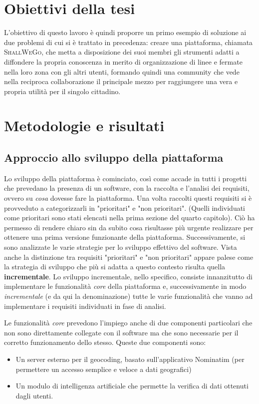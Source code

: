 \section{Obiettivi della tesi}
    L'obiettivo di questo lavoro è quindi proporre un primo esempio di soluzione ai due problemi di cui si è trattato in precedenza: creare una piattaforma, chiamata \textsc{ShallWeGo}, che metta a disposizione dei suoi membri gli strumenti adatti a diffondere la propria conoscenza in merito di organizzazione di linee e fermate nella loro zona con gli altri utenti, formando quindi una community che vede nella reciproca collaborazione il principale mezzo per raggiungere una vera e propria utilità per il singolo cittadino.

    
    
\section{Metodologie e risultati}
    \subsection{Approccio allo sviluppo della piattaforma}
        Lo sviluppo della piattaforma è cominciato, così come accade in tutti i progetti che prevedano la presenza di un software, con la raccolta e l'analisi dei requisiti, ovvero su \textit{cosa} dovesse fare la piattaforma. Una volta raccolti questi requisiti si è provveduto a categorizzarli in "prioritari" e "non prioritari". (Quelli individuati come prioritari sono stati elencati nella prima sezione del quarto capitolo). Ciò ha permesso di rendere chiaro sin da subito cosa risultasse più urgente realizzare per ottenere una prima versione funzionante della piattaforma. 
        Successivamente, si sono analizzate le varie strategie per lo sviluppo effettivo del software. Vista anche la distinzione tra requisiti "prioritari" e "non prioritari" appare palese come la strategia di sviluppo che più si adatta a questo contesto risulta quella \textbf{incrementale}. Lo sviluppo incrementale, nello specifico, consiste innanzitutto di implementare le funzionalità \textit{core} della piattaforma e, successivamente in modo \textit{incrementale} (e da qui la denominazione) tutte le varie funzionalità che vanno ad implementare i requisiti individuati in fase di analisi. 
        
        Le funzionalità \textit{core} prevedono l'impiego anche di due componenti particolari che non sono direttamente collegate con il software ma che sono necessarie per il corretto funzionamento dello stesso. Queste due componenti sono:
        \begin{itemize}
            \item Un server esterno per il geocoding, basato sull'applicativo Nominatim (per permettere un accesso semplice e veloce a dati geografici)
            \item Un modulo di intelligenza artificiale che permette la verifica di dati ottenuti dagli utenti.
        \end{itemize}

